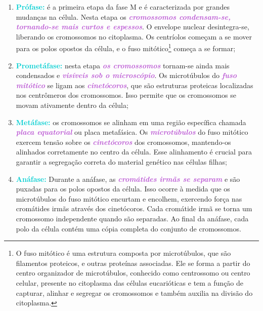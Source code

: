 \documentclass[11pt,a4paper]{article}
\begin{document}
	\begin{enumerate}
		\item \textcolor{DarkTurquoise}{\textbf{Prófase:}} é a primeira etapa da fase M e é caracterizada por grandes mudanças na célula. Nesta etapa os \textcolor{MediumOrchid}{\textbf{\textit{cromossomos condensam-se, tornando-se mais curtos e espessos}}}. O envelope nuclear desintegra-se, liberando os cromossomos no citoplasma. Os centríolos começam a se mover para os polos opostos da célula, e o fuso mitótico\footnote{O fuso mitótico é uma estrutura composta por microtúbulos, que são filamentos proteicos, e outras proteínas associadas. Ele se forma a partir do centro organizador de microtúbulos, conhecido como centrossomo ou centro celular, presente no citoplasma das células eucarióticas e tem a função de capturar, alinhar e segregar os cromossomos e também auxilia na divisão do citoplasma.} começa a se formar;
		\item \textcolor{DarkTurquoise}{\textbf{Prometáfase:}} nesta etapa \textcolor{MediumOrchid}{\textbf{\textit{os cromossomos}}} tornam-se ainda mais condensados e \textcolor{MediumOrchid}{\textbf{\textit{visíveis sob o microscópio}}}. Os microtúbulos do \textcolor{MediumOrchid}{\textbf{\textit{fuso mitótico}}} se ligam aos \textcolor{MediumOrchid}{\textbf{\textit{cinetócoros}}}, que são estruturas proteicas localizadas nos centrômeros dos cromossomos. Isso permite que os cromossomos se movam ativamente dentro da célula;
		\item \textcolor{DarkTurquoise}{\textbf{Metáfase:}} os cromossomos se alinham em uma região específica chamada \textcolor{MediumOrchid}{\textbf{\textit{placa equatorial}}} ou placa metafásica. Os \textcolor{MediumOrchid}{\textbf{\textit{microtúbulos}}} do fuso mitótico exercem tensão sobre os \textcolor{MediumOrchid}{\textbf{\textit{cinetócoros}}} dos cromossomos, mantendo-os alinhados corretamente no centro da célula. Esse alinhamento é crucial para garantir a segregação correta do material genético nas células filhas;
		\item \textcolor{DarkTurquoise}{\textbf{Anáfase:}} Durante a anáfase, as \textcolor{MediumOrchid}{\textbf{\textit{cromátides irmãs se separam}}} e são puxadas para os polos opostos da célula. Isso ocorre à medida que os microtúbulos do fuso mitótico encurtam e encolhem, exercendo força nas cromátides irmãs através dos cinetócoros. Cada cromátide irmã se torna um cromossomo independente quando são separadas. Ao final da anáfase, cada polo da célula contém uma cópia completa do conjunto de cromossomos.

\end{enumerate}
\end{document}
